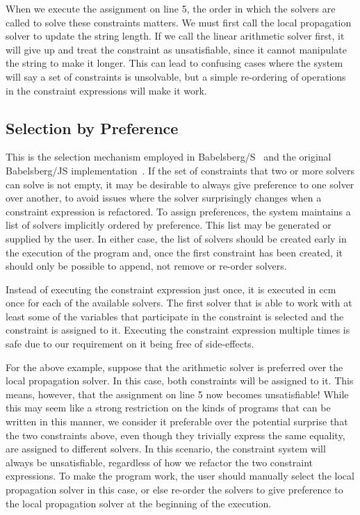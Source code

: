 \documentclass[numbers]{sigplanconf}
\begin{document}
When we execute the assignment on line 5, the order in which the
solvers are called to solve these constraints matters. We must first
call the local propagation solver to update the string length. If we
call the linear arithmetic solver first, it will give up and treat the
constraint as unsatisfiable, since it cannot manipulate the string to
make it longer. This can lead to confusing cases where the system will
say a set of constraints is unsolvable, but a simple re-ordering of
operations in the constraint expressions will make it work.

\subsection{Selection by Preference}
This is the selection mechanism employed in Babelsberg/S~\cite{GraberREBLS2014}
and the original Babelsberg/JS
implementation~\cite{felgentreff2014babelsbergjs}. If the set of constraints
that two or more solvers can solve is not empty, it may be desirable to always
give preference to one solver over another, to avoid issues where the solver
surprisingly changes when a constraint expression is refactored. To assign
preferences, the system maintains a list of solvers implicitly ordered by
preference. This list may be generated or supplied by the user. In either case,
the list of solvers should be created early in the execution of the program and,
once the first constraint has been created, it should only be possible to
append, not remove or re-order solvers.

Instead of executing the constraint expression just once, it is executed in
\gls{ccm} once for each of the available solvers. The first solver that is able
to work with at least some of the variables that participate in the constraint
is selected and the constraint is assigned to it. Executing the constraint
expression multiple times is safe due to our requirement on it being free of
side-effects.

For the above example, suppose that the arithmetic solver is preferred
over the local propagation solver. In this case, both constraints will
be assigned to it. This means, however, that the assignment on line 5
now becomes unsatisfiable! While this may seem like a strong
restriction on the kinds of programs that can be written in this
manner, we consider it preferable over the potential surprise that the
two constraints above, even though they trivially express the same
equality, are assigned to different solvers. In this scenario, the
constraint system will always be unsatisfiable, regardless of how we
refactor the two constraint expressions. To make the program work, the
user should manually select the local propagation solver in this case,
or else re-order the solvers to give preference to the local
propagation solver at the beginning of the execution.
\end{document}
